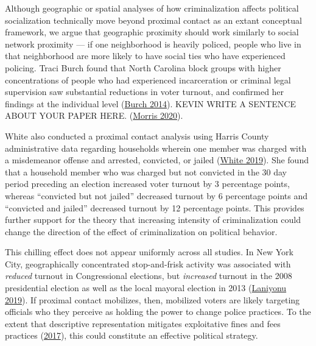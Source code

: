 \documentclass[
  12pt,
]{article}
\begin{document}
Although geographic or spatial analyses of how criminalization affects political socialization technically move beyond proximal contact as an extant conceptual framework, we argue that geographic proximity should work similarly to social network proximity --- if one neighborhood is heavily policed, people who live in that neighborhood are more likely to have social ties who have experienced policing. Traci Burch found that North Carolina block groups with higher concentrations of people who had experienced incarceration or criminal legal supervision saw substantial reductions in voter turnout, and confirmed her findings at the individual level (\protect\hyperlink{ref-Burch2014}{Burch 2014}). KEVIN WRITE A SENTENCE ABOUT YOUR PAPER HERE. (\protect\hyperlink{ref-Morris2020}{Morris 2020}).

White also conducted a proximal contact analysis using Harris County administrative data regarding households wherein one member was charged with a misdemeanor offense and arrested, convicted, or jailed (\protect\hyperlink{ref-White2019}{White 2019}). She found that a household member who was charged but not convicted in the 30 day period preceding an election increased voter turnout by 3 percentage points, whereas ``convicted but not jailed'' decreased turnout by 6 percentage points and ``convicted and jailed'' decreased turnout by 12 percentage points. This provides further support for the theory that increasing intensity of criminalization could change the direction of the effect of criminalization on political behavior.

This chilling effect does not appear uniformly across all studies. In New York City, geographically concentrated stop-and-frisk activity was associated with \emph{reduced} turnout in Congressional elections, but \emph{increased} turnout in the 2008 presidential election as well as the local mayoral election in 2013 (\protect\hyperlink{ref-Laniyonu2019}{Laniyonu 2019}). If proximal contact mobilizes, then, mobilized voters are likely targeting officials who they perceive as holding the power to change police practices. To the extent that descriptive representation mitigates exploitative fines and fees practices (\protect\hyperlink{ref-Sances2017}{2017}), this could constitute an effective political strategy.
\end{document}
